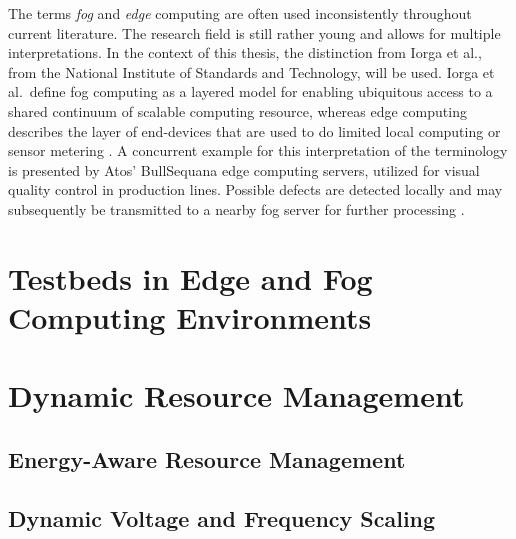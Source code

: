 The terms \emph{fog} and \emph{edge} computing are often used inconsistently
throughout current literature. The research field is still rather young and
allows for multiple interpretations. In the context of this thesis, the
distinction from Iorga et al., from the National Institute of Standards and
Technology, will be used. Iorga et al.\ define fog computing as a layered model
for enabling ubiquitous access to a shared continuum of scalable computing
resource, whereas edge computing describes the layer of end-devices that are
used to do limited local computing or sensor metering \cite{iorga2018}. A
concurrent example for this interpretation of the terminology is presented by
Atos' BullSequana edge computing servers, utilized for visual quality control in
production lines. Possible defects are detected locally and may subsequently be
transmitted to a nearby fog server for further processing \cite{atos2020}.

\section{Testbeds in Edge and Fog Computing Environments}
\label{sec:testbeds_in_edge_and_fog_computing_environments}

\section{Dynamic Resource Management}
\label{sec:dynamic_resource_management}

\subsection{Energy-Aware Resource Management}
\label{sec:energy-aware_resource_management}

\subsection{Dynamic Voltage and Frequency Scaling}
\label{sec:dynamic_voltage_and_frequency_scaling}

